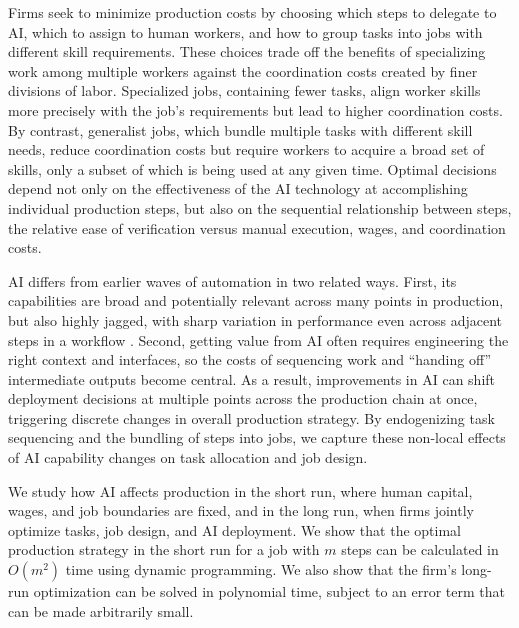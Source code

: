 Firms seek to minimize production costs by choosing which steps to delegate to AI, which to assign to human workers, and how to group tasks into jobs with different skill requirements.
These choices trade off the benefits of specializing work among multiple workers against the coordination costs created by finer divisions of labor.
Specialized jobs, containing fewer tasks, align worker skills more precisely with the job's requirements but lead to higher coordination costs. 
By contrast, generalist jobs, which bundle multiple tasks with different skill needs, reduce coordination costs but require workers to acquire a broad set of skills, only a subset of which is being used at any given time.
Optimal decisions depend not only on the effectiveness of the AI technology at accomplishing individual production steps, but also on the sequential relationship between steps, the relative ease of verification versus manual execution, wages, and coordination costs.

AI differs from earlier waves of automation in two related ways.
First, its capabilities are broad and potentially relevant across many points in production, but also highly jagged, with sharp variation in performance even across adjacent steps in a workflow \citep{dell2023navigating}. 
Second, getting value from AI often requires engineering the right context and interfaces, so the costs of sequencing work and ``handing off'' intermediate outputs become central. 
As a result, improvements in AI can shift deployment decisions at multiple points across the production chain at once, triggering discrete changes in overall production strategy. 
By endogenizing task sequencing and the bundling of steps into jobs, we capture these non-local effects of AI capability changes on task allocation and job design. 

We study how AI affects production in the short run, where human capital, wages, and job boundaries are fixed, and in the long run, when firms jointly optimize tasks, job design, and AI deployment.
We show that the optimal production strategy in the short run for a job with  $m$ steps can be calculated in $O(m^2)$ time using dynamic programming. 
We also show that the firm's long-run optimization can be solved in polynomial time, subject to an error term that can be made arbitrarily small. 


